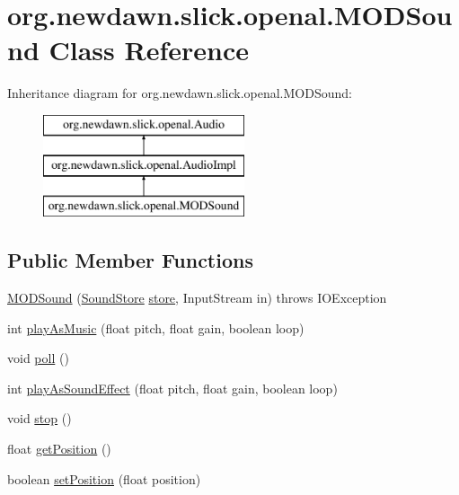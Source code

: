 \hypertarget{classorg_1_1newdawn_1_1slick_1_1openal_1_1_m_o_d_sound}{}\section{org.\+newdawn.\+slick.\+openal.\+M\+O\+D\+Sound Class Reference}
\label{classorg_1_1newdawn_1_1slick_1_1openal_1_1_m_o_d_sound}
Inheritance diagram for org.\+newdawn.\+slick.\+openal.\+M\+O\+D\+Sound\+:\begin{figure}[H]
\begin{center}
\leavevmode
\includegraphics[height=3.000000cm]{classorg_1_1newdawn_1_1slick_1_1openal_1_1_m_o_d_sound}
\end{center}
\end{figure}
\subsection*{Public Member Functions}
\begin{DoxyCompactItemize}
\item 
\mbox{\hyperlink{classorg_1_1newdawn_1_1slick_1_1openal_1_1_m_o_d_sound_aa572d7f4bfa20aa03682a937f9d969c1}{M\+O\+D\+Sound}} (\mbox{\hyperlink{classorg_1_1newdawn_1_1slick_1_1openal_1_1_sound_store}{Sound\+Store}} \mbox{\hyperlink{classorg_1_1newdawn_1_1slick_1_1openal_1_1_m_o_d_sound_a36ab5f890c0566a6f9b1797fa91fdc7e}{store}}, Input\+Stream in)  throws I\+O\+Exception 
\item 
int \mbox{\hyperlink{classorg_1_1newdawn_1_1slick_1_1openal_1_1_m_o_d_sound_a36e50d276fcfb6cc72c209abc9a9bdee}{play\+As\+Music}} (float pitch, float gain, boolean loop)
\item 
void \mbox{\hyperlink{classorg_1_1newdawn_1_1slick_1_1openal_1_1_m_o_d_sound_a25a03884f08e6a5a8c711ab7ea339b64}{poll}} ()
\item 
int \mbox{\hyperlink{classorg_1_1newdawn_1_1slick_1_1openal_1_1_m_o_d_sound_a401fe36df439ad47cf3431459c5c9d79}{play\+As\+Sound\+Effect}} (float pitch, float gain, boolean loop)
\item 
void \mbox{\hyperlink{classorg_1_1newdawn_1_1slick_1_1openal_1_1_m_o_d_sound_ab8d293141044f71f49e65e730b215be7}{stop}} ()
\item 
float \mbox{\hyperlink{classorg_1_1newdawn_1_1slick_1_1openal_1_1_m_o_d_sound_ad3ac36d37787ee920277826347875e4a}{get\+Position}} ()
\item 
boolean \mbox{\hyperlink{classorg_1_1newdawn_1_1slick_1_1openal_1_1_m_o_d_sound_a28988cbdc108aa8daab78bbad8750f97}{set\+Position}} (float position)
\end{DoxyCompactItemize}
